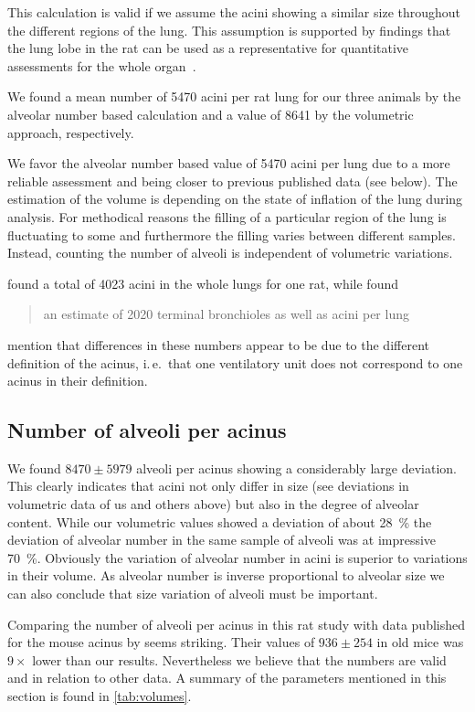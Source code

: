 \documentclass[paper=a4,twocolumn=true,DIV=calc,abstract,english]{scrartcl}
\newcommand{\ie}{i.\,e.\ }
\newcommand{\meantotalnumberofacini}{8641\xspace}
\newcommand{\meantotalnumberofaciniVariant}{5470\xspace}
\newcommand{\meannumberofalveoli}{8470\xspace} %
\newcommand{\meannumberofalveoliSTD}{5979\xspace}
\begin{document}
This calculation is valid if we assume the acini showing a similar size throughout the different regions of the lung.
This assumption is supported by findings that the lung lobe in the rat can be used as a representative for quantitative assessments for the whole organ~\citep{Zeltner1990}.

We found a mean number of \meantotalnumberofaciniVariant acini per rat lung for our three animals by the alveolar number based calculation and a value of \meantotalnumberofacini by the volumetric approach, respectively.

We favor the alveolar number based value of \meantotalnumberofaciniVariant acini per lung due to a more reliable assessment and being closer to previous published data (see below).
The estimation of the volume is depending on the state of inflation of the lung during analysis.
For methodical reasons the filling of a particular region of the lung is fluctuating to some  and furthermore the filling varies between different samples.
Instead, counting the number of alveoli is independent of volumetric variations.

\citet{Rodriguez1987} found a total of 4023 acini in the whole lungs for one rat, while \citet{Mercer1987a} found \blockquote{an estimate of 2020 terminal bronchioles as well as acini per lung}.
\citeauthor{Mercer1987a} mention that differences in these numbers appear to be due to the different definition of the acinus, \ie that one ventilatory unit does not correspond to one acinus in their definition.

\subsection{Number of alveoli per acinus}
We found \(\meannumberofalveoli\pm\meannumberofalveoliSTD\) alveoli per acinus showing a considerably large deviation.
This clearly indicates that acini not only differ in size (see deviations in volumetric data of us and others above) but also in the degree of alveolar content.
While our volumetric values showed a deviation of about \SI{28}{\percent} the deviation of alveolar number in the same sample of alveoli was at impressive \SI{70}{\percent}.
Obviously the variation of alveolar number in acini is superior to variations in their volume.
As alveolar number is inverse proportional to alveolar size we can also conclude that size variation of alveoli must be important.

Comparing the number of alveoli per acinus in this rat study with data published for the mouse acinus by \citet{Vasilescu2012} seems striking.
Their values of \(936\pm254\) in old mice was \(9\times\) lower than our results.
Nevertheless we believe that the numbers are valid and in relation to other data.
A summary of the parameters mentioned in this section is found in \autoref{tab:volumes}.
\end{document}
